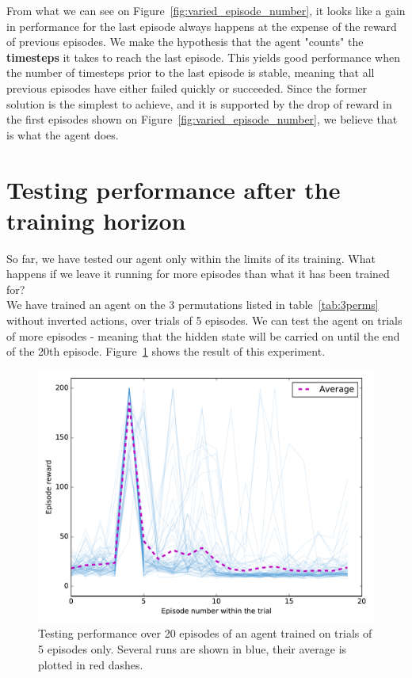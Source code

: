 From what we can see on Figure~\ref{fig:varied_episode_number}, it looks like
a gain in performance for the last episode always happens at the expense of
the reward of previous episodes. We make the hypothesis that the agent
"counts" the \textbf{timesteps} it takes to reach the last episode. This yields good
performance when the number of timesteps prior to the last episode is stable, 
meaning that all previous episodes have either failed quickly or succeeded. Since
the former solution is the simplest to achieve, and it is supported by the 
drop of reward in the first episodes shown on 
Figure~\ref{fig:varied_episode_number}, we believe that is what the agent does.


\section{Testing performance after the training horizon}
So far, we have tested our agent only within the limits of its training.
What happens if we leave it running for more episodes than what it
has been trained for?\\

We have trained an agent on the 3 permutations listed in table~\ref{tab:3perms}
without inverted actions, over trials of 5 episodes.
We can test the agent on trials of more episodes - meaning that the hidden
state will be carried on until the end of the 20th episode.
Figure~\ref{fig:horizon_5_3perms} shows the result of this experiment.\\

\begin{figure}
	\centering
	\includegraphics[width=0.70\linewidth]{fig/horizon_5_3perms.pdf}
	\caption{Testing performance over 20 episodes of an agent trained on 
	trials of 5 episodes only. Several runs are shown in blue, their
	average is plotted in red dashes.}
	\label{fig:horizon_5_3perms}
\end{figure}

